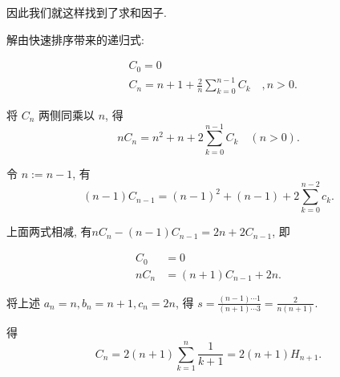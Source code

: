 \documentclass{ctexart}
\begin{document}
因此我们就这样找到了求和因子.

\begin{example}
	解由快速排序带来的递归式:

	$$
		\begin{aligned}
			 & C_0=0                                                 \\
			 & C_n=n+1+\frac{2}{n} \sum_{k=0}^{n-1} C_k \quad, n>0 .
		\end{aligned}
	$$

	将 $C_n$ 两侧同乘以 $n$, 得
	$$
		n C_n=n^2+n+2 \sum_{k=0}^{n-1} C_k \quad(n>0).
	$$

	令 $n:=n-1$, 有 $$
		(n-1) C_{n-1}=(n-1)^2+(n-1)+2 \sum_{k=0}^{n-2} c_k.
	$$

	上面两式相减, 有$n C_n-(n-1) C_{n-1}=2 n+2 C_{n-1}$, 即

	$$
		\begin{aligned}
			C_0   & =0                   \\
			n C_n & =(n+1) C_{n-1}+2 n .
		\end{aligned}
	$$

	将上述 $a_n=n, b_n=n+1, c_n=2 n$, 得 $s=\frac{(n-1) \cdots 1}{(n+1) \cdots 3}=\frac{2}{n(n+1)}$.

	得
	$$
		C_n=2(n+1) \sum_{k=1}^n \frac{1}{k+1}=2(n+1) H_{n+1}.
	$$

\end{example}
\end{document}
